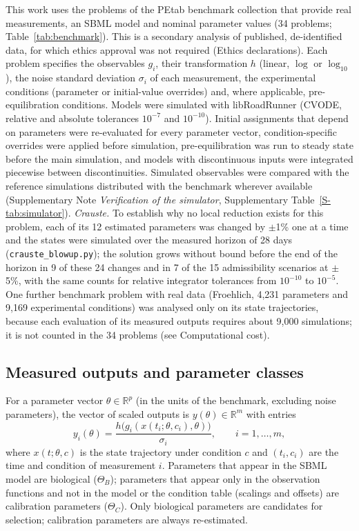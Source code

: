 \documentclass[pdflatex,sn-nature]{sn-jnl}
\theoremstyle{plain}
\begin{document}
This work uses the problems of the PEtab benchmark collection\cite{bib31,bib27} that provide real measurements, an SBML model and nominal parameter values (34 problems; Table~\ref{tab:benchmark}). This is a secondary analysis of published, de-identified data, for which ethics approval was not required (Ethics declarations). Each problem specifies the observables $g_i$, their transformation $h$ (linear, $\log$ or $\log_{10}$), the noise standard deviation $\sigma_i$ of each measurement, the experimental conditions (parameter or initial-value overrides) and, where applicable, pre-equilibration conditions. Models were simulated with libRoadRunner\cite{bib32} (CVODE, relative and absolute tolerances $10^{-7}$ and $10^{-10}$). Initial assignments that depend on parameters were re-evaluated for every parameter vector, condition-specific overrides were applied before simulation, pre-equilibration was run to steady state before the main simulation, and models with discontinuous inputs were integrated piecewise between discontinuities. Simulated observables were compared with the reference simulations distributed with the benchmark wherever available (Supplementary Note \textit{Verification of the simulator}, Supplementary Table~\ref{S-tab:simulator}). \label{met:crauste}\emph{Crauste.} To establish why no local reduction exists for this problem, each of its 12 estimated parameters was changed by $\pm$1\% one at a time and the states were simulated over the measured horizon of 28 days (\texttt{crauste\_blowup.py}); the solution grows without bound before the end of the horizon in 9 of these 24 changes and in 7 of the 15 admissibility scenarios at $\pm$5\%, with the same counts for relative integrator tolerances from $10^{-10}$ to $10^{-5}$. One further benchmark problem with real data (Froehlich, 4,231 parameters and 9,169 experimental conditions) was analysed only on its state trajectories, because each evaluation of its measured outputs requires about 9,000 simulations; it is not counted in the 34 problems (see Computational cost).

\subsection*{Measured outputs and parameter classes}\label{met:outputs}

For a parameter vector $\theta\in\mathbb{R}^p$ (in the units of the benchmark, excluding noise parameters), the vector of scaled outputs is $y(\theta)\in\mathbb{R}^m$ with entries
\begin{equation}
y_i(\theta)=\frac{h\big(g_i(x(t_i;\theta,c_i),\theta)\big)}{\sigma_i},\qquad i=1,\dots,m,
\label{eq:outputs}
\end{equation}
where $x(t;\theta,c)$ is the state trajectory under condition $c$ and $(t_i,c_i)$ are the time and condition of measurement $i$. Parameters that appear in the SBML model are biological ($\Theta_B$); parameters that appear only in the observation functions and not in the model or the condition table (scalings and offsets) are calibration parameters ($\Theta_C$). Only biological parameters are candidates for selection; calibration parameters are always re-estimated.
\end{document}
